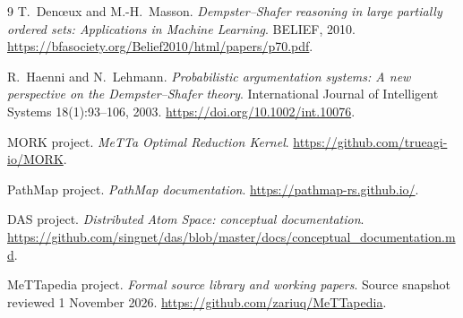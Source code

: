 \documentclass[11pt,a4paper]{article}
\begin{document}
\begin{thebibliography}{9}
T.~Den\oe ux and M.-H.~Masson.
\emph{Dempster--Shafer reasoning in large partially ordered sets:
Applications in Machine Learning}. BELIEF, 2010.
\url{https://bfasociety.org/Belief2010/html/papers/p70.pdf}.

R.~Haenni and N.~Lehmann.
\emph{Probabilistic argumentation systems: A new perspective on the
Dempster--Shafer theory}. International Journal of Intelligent Systems
18(1):93--106, 2003. \url{https://doi.org/10.1002/int.10076}.

MORK project. \emph{MeTTa Optimal Reduction Kernel}.
\url{https://github.com/trueagi-io/MORK}.

PathMap project. \emph{PathMap documentation}.
\url{https://pathmap-rs.github.io/}.

DAS project. \emph{Distributed Atom Space: conceptual documentation}.
\url{https://github.com/singnet/das/blob/master/docs/conceptual_documentation.md}.

MeTTapedia project. \emph{Formal source library and working papers}.
Source snapshot reviewed 1 November 2026.
\url{https://github.com/zariuq/MeTTapedia}.
\end{thebibliography}
\endgroup
\end{document}
